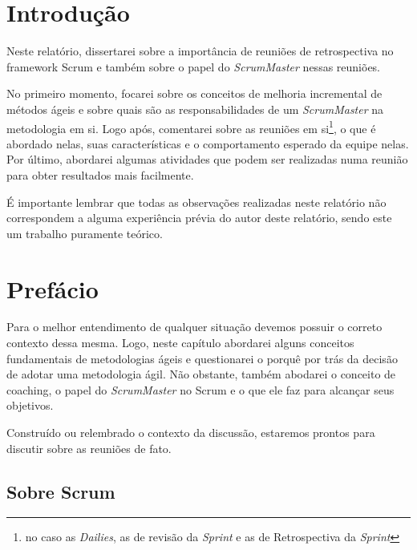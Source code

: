\documentclass{iiufrgs}
\begin{document}
%

\chapter{Introdução}\label{intro}

Neste relatório, dissertarei sobre a importância de reuniões de retrospectiva no framework Scrum e também sobre o papel do \textit{ScrumMaster} nessas reuniões. 

No primeiro momento, focarei sobre os conceitos de melhoria incremental de métodos ágeis e sobre quais são as responsabilidades de um \textit{ScrumMaster} na metodologia em si. Logo após, comentarei sobre as reuniões em si\footnote{no caso as \textit{Dailies}, as de revisão da \textit{Sprint} e as de Retrospectiva da \textit{Sprint}}, o que é abordado nelas, suas características e o comportamento esperado da equipe nelas. Por último, abordarei algumas atividades que podem ser realizadas numa reunião para obter resultados mais facilmente.

É importante lembrar que todas as observações realizadas neste relatório não correspondem a alguma experiência prévia do autor deste relatório, sendo este um trabalho puramente teórico.


%

\chapter{Prefácio}\label{pref}

Para o melhor entendimento de qualquer situação devemos possuir o correto contexto dessa mesma. Logo, neste capítulo abordarei alguns conceitos fundamentais de metodologias ágeis e questionarei o porquê por trás da decisão de adotar uma metodologia ágil. Não obstante, também abodarei o conceito de coaching, o papel do \textit{ScrumMaster} no Scrum e o que ele faz para alcançar seus objetivos.

Construído ou relembrado o contexto da discussão, estaremos prontos para discutir sobre as reuniões de fato.



\section{Sobre Scrum}\label{Scrum}
\end{document}
